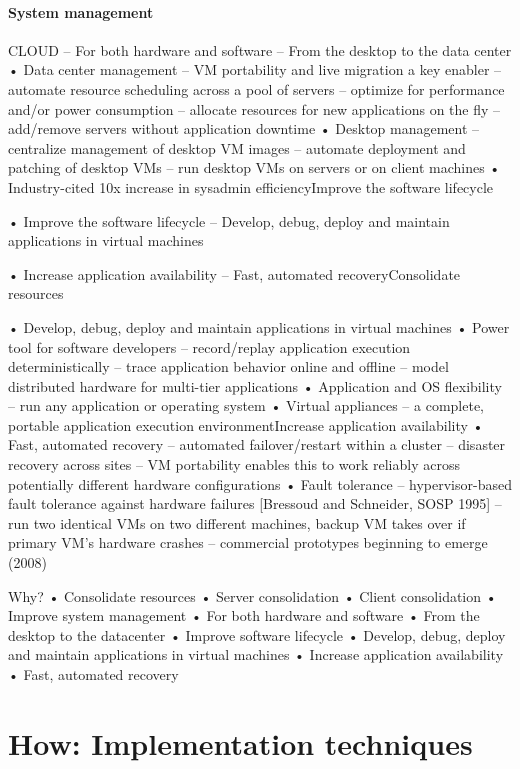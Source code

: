 \documentclass[10pt]{article}
\begin{document}
\paragraph{System management} 
CLOUD
–  For both hardware and software
–  From the desktop to the data center
•  Data center management
–  VM portability and live migration a key enabler
–  automate resource scheduling across a pool of
servers
–  optimize for performance and/or power consumption
–  allocate resources for new applications on the fly
–  add/remove servers without application downtime
•  Desktop management
–  centralize management of desktop VM images
–  automate deployment and patching of desktop VMs
–  run desktop VMs on servers or on client machines
•  Industry-cited 10x increase in sysadmin
efficiencyImprove the software lifecycle



•  Improve the software lifecycle
–  Develop, debug, deploy and maintain
applications in virtual machines

•  Increase application availability
–  Fast, automated recoveryConsolidate resources


•  Develop, debug, deploy and maintain
applications in virtual machines
•  Power tool for software developers
–  record/replay application execution deterministically
–  trace application behavior online and offline
–  model distributed hardware for multi-tier applications
•  Application and OS flexibility
–  run any application or operating system
•  Virtual appliances
–  a complete, portable application execution
environmentIncrease application availability
•  Fast, automated recovery
–  automated failover/restart within a cluster
–  disaster recovery across sites
–  VM portability enables this to work reliably across
potentially different hardware configurations
•  Fault tolerance
–  hypervisor-based fault tolerance against hardware
failures [Bressoud and Schneider, SOSP 1995]
–  run two identical VMs on two different machines,
backup VM takes over if primary VM’s hardware
crashes
–  commercial prototypes beginning to emerge (2008)

Why?
• Consolidate resources
• Server consolidation
• Client consolidation
• Improve system management
• For both hardware and software
• From the desktop to the datacenter
• Improve software lifecycle
• Develop, debug, deploy and maintain applications in virtual
machines
• Increase application availability
• Fast, automated recovery

\section{How: Implementation techniques}
\end{document}
